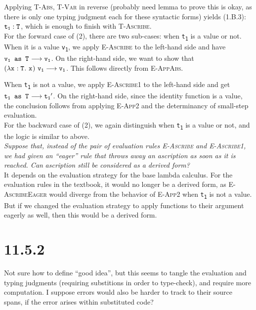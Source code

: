 \documentclass{article}
\newcommand{\term}[1]{\texttt{t\textsubscript{#1}}}
\newcommand{\val}[1]{\texttt{v\textsubscript{#1}}}
\newcommand{\ty}[1]{\texttt{T\textsubscript{#1}}}
\newcommand{\var}[1]{\texttt{x\textsubscript{#1}}}
\renewcommand{\ss}[2]{#1 \longrightarrow #2}
\newcommand{\ms}[1]{\texttt{#1}}
\theoremstyle{remark}
\begin{document}
    Applying \textsc{T-Abs}, \textsc{T-Var} in reverse (probably need lemma to prove
    this is okay, as there is only one typing judgment each for these syntactic forms)
    yields (1.B.3): $\term{1} : \ty{}$, which is enough to finish with \textsc{T-Ascribe}. \\

    For the forward case of (2), there are two sub-cases: when \term{1} is a value or not.
    When it is a value \val{1}, we apply \textsc{E-Ascribe} to the left-hand side and have
    $\ss{\ms{\val{1} as \ty{}} }{\val{1}}$. On the right-hand side, we want to show that
    $\ss{(\lambda \var{} : \ty{}.\ \var{})\ \val{1}}{\val{1}}$. This follows directly from
    \textsc{E-AppAbs}.

    When \term{1} is not a value, we apply \textsc{E-Ascribe1} to the left-hand side and
    get $\ss{\ms{\term{1} as \ty{}}}{\term{1}'}$. On the right-hand side, since the identity
    function is a value, the conclusion follows from applying \textsc{E-App2} and the determinancy
    of small-step evaluation. \\

    For the backward case of (2), we again distinguish when \term{1} is a value or not,
    and the logic is similar to above. \\

    \textit{Suppose that, instead of the pair of evaluation rules \textsc{E-Ascribe} and \textsc{E-Ascribe1},}
    \textit{we had given an ``eager'' rule that throws away an ascription as soon as it is reached. Can}
    \textit{ascription still be considered as a derived form?} \\

    It depends on the evaluation strategy for the base lambda calculus. For the evaluation rules
    in the textbook, it would no longer be a derived form, as \textsc{E-AscribeEager} would diverge
    from the behavior of \textsc{E-App2} when \term{1} is not a value. But if we changed the evaluation
    strategy to apply functions to their argument eagerly as well, then this would be a derived form.

\section{11.5.2}

    Not sure how to define ``good idea'', but this seems to tangle the evaluation and typing judgments
    (requiring substitions in order to type-check), and require more computation. I suppose errors would
    also be harder to track to their source spans, if the error arises within substituted code?
\end{document}

